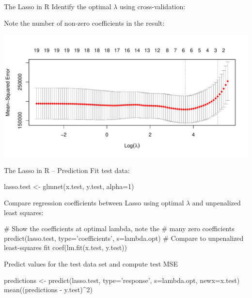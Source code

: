 \documentclass[ignorenonframetext,xcolor=x11names]{beamer}
\begin{document}
\begin{frame}[fragile]{The Lasso in R}
\small
Identify the optimal $\lambda$ using cross-validation:
Note the number of non-zero coefficients in the result:
\begin{center}
\includegraphics[width=.8\textwidth]{crossvalidated_lasso.pdf}
\end{center}
\end{frame}

\begin{frame}[fragile]{The Lasso in R -- Prediction}
Fit test data:
\begin{Rcode}
lasso.test <- glmnet(x.test, y.test, alpha=1)
\end{Rcode}
Compare regression coefficients between Lasso using optimal $\lambda$ and unpenalized least squares:
\begin{Rcode}
# Show the coefficients at optimal lambda, note the 
# many zero coefficients
predict(lasso.test, type='coefficients', s=lambda.opt)
# Compare to unpenalized least-squares fit
coef(lm.fit(x.test, y.test))
\end{Rcode}
Predict values for the test data set and compute test MSE
\begin{Rcode}
predictions <- predict(lasso.test, type='response', 
                       s=lambda.opt, newx=x.test)
mean((predictions - y.test)^2)
\end{Rcode}
\end{frame}
\end{document}
